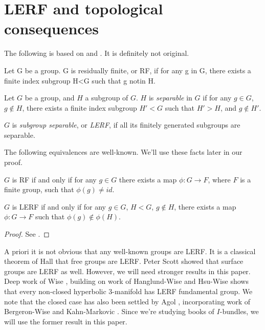 \section{LERF and topological consequences}

The following is based on \cite{AFW} and \cite{LR}. It is definitely not
original.

\begin{defn}

Let G be a group. G is residually finite, or RF, if for any g in G, there
exists a finite index subgroup H<G such that g notin H.

Let $G$ be a group, and $H$ a subgroup of $G$. $H$ is \emph{separable} in $G$
if for any $g \in G$, $g \notin H$, there exists a finite index subgroup $H'<G$
such that $H'>H$, and $g \notin H'$.

$G$ is \emph{subgroup separable}, or \emph{LERF}, if all its finitely generated
subgroups are separable.

\end{defn}

The following equivalences are well-known.  We'll use these facts later in our
proof.

\begin{prop}

$G$ is RF if and only if for any $g \in G$ there exists a map $\phi \colon
G \to F$, where $F$ is a finite group, such that $\phi(g) \neq id$.

$G$ is LERF if and only if for any $g \in G$, $H < G$, $g \notin H$, there
exists a map $\phi \colon G \to F$ such that $\phi(g) \notin \phi(H)$.

\end{prop}

\begin{proof}

See \cite{LR}.

\end{proof}

A priori it is not obvious that any well-known groups are LERF. It is
a classical theorem of Hall \cite{Hall} that free groups are LERF. Peter Scott
\cite{Scott} showed that surface groups are LERF as well. However, we will need
stronger results in this paper. Deep work of Wise \cite{Wise}, building on work
of Hanglund-Wise \cite{HaglundWise} and Hsu-Wise \cite{HsuWise} shows that
every non-closed hyperbolic 3-manifold has LERF fundamental group. We note that
the closed case has also been settled by Agol \cite{Agol}, incorporating work
of Bergeron-Wise \cite{BergeronWise} and Kahn-Markovic \cite{KM}. Since we're
studying books of $I$-bundles, we will use the former result in this paper.

